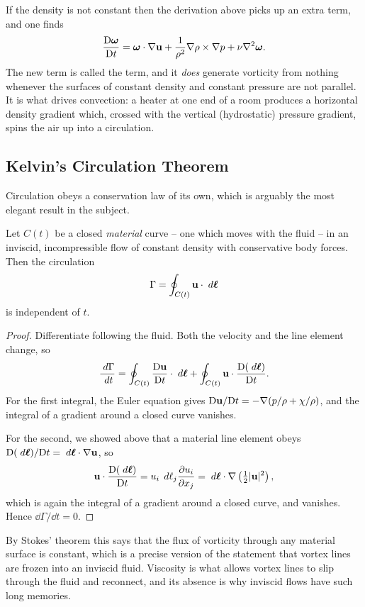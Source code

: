 \documentclass[a4paper]{scrartcl}
\newcommand{\D}{\mathrm{D}}
\newcommand{\Dt}[1]{\frac{\D #1}{\D t}}
\newcommand{\pd}[2]{\frac{\partial #1}{\partial #2}}
\newcommand{\bom}{\boldsymbol{\omega}}
\newcommand{\bell}{\boldsymbol{\ell}}
\begin{document}
\begin{remark}
	If the density is not constant then the derivation above picks up an extra term, and one finds
	$$
	\Dt{\bom} = \bom \cdot \nabla \vv u + \frac{1}{\rho^2}\nabla \rho \times \nabla p + \nu \nabla^2 \bom.
	$$
	The new term is called the  term, and it \emph{does} generate vorticity from nothing whenever the surfaces of constant density and constant pressure are not parallel. It is what drives convection: a heater at one end of a room produces a horizontal density gradient which, crossed with the vertical (hydrostatic) pressure gradient, spins the air up into a circulation.
\end{remark}

\subsection{Kelvin's Circulation Theorem}

Circulation obeys a conservation law of its own, which is arguably the most elegant result in the subject.

\begin{theorem}
	Let $C(t)$ be a closed \emph{material} curve -- one which moves with the fluid -- in an inviscid, incompressible flow of constant density with conservative body forces. Then the circulation
	$$
	\Gamma = \oint_{C(t)} \vv u \cdot \dd \bell
	$$
	is independent of $t$.
\end{theorem}
\begin{proof}
	Differentiate following the fluid. Both the velocity and the line element change, so
	$$
	\frac{\dd \Gamma}{\dd t} = \oint_{C(t)} \Dt{\vv u}\cdot \dd \bell + \oint_{C(t)} \vv u \cdot \Dt{(\dd \bell)}.
	$$
	For the first integral, the Euler equation gives $\D \vv u/\D t = -\nabla(p/\rho + \chi/\rho)$, and the integral of a gradient around a closed curve vanishes.

	For the second, we showed above that a material line element obeys $\D(\dd\bell)/\D t = \dd \bell \cdot \nabla \vv u$, so
	$$
	\vv u \cdot \Dt{(\dd\bell)} = u_i \, \dd \ell_j \pd{u_i}{x_j} = \dd \bell \cdot \nabla \left(\tfrac{1}{2}|\vv u|^2\right),
	$$
	which is again the integral of a gradient around a closed curve, and vanishes. Hence $\dd\Gamma/\dd t = 0$. \qedhere
\end{proof}

By Stokes' theorem this says that the flux of vorticity through any material surface is constant, which is a precise version of the statement that vortex lines are frozen into an inviscid fluid. Viscosity is what allows vortex lines to slip through the fluid and reconnect, and its absence is why inviscid flows have such long memories.
\end{document}
